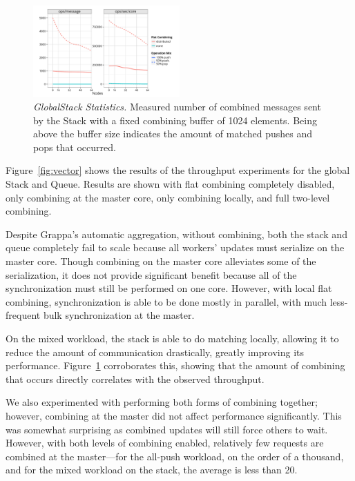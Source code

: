 \begin{figure}[t]
  \centering
  \includegraphics[width=0.5\textwidth]{data/plots/stack_stats.pdf}
  \caption{\emph{GlobalStack Statistics.}
    Measured number of combined messages sent by the Stack with a fixed combining buffer of 1024 elements. Being above the buffer size indicates the amount of matched pushes and pops that occurred.
  }
  \label{fig:stack_stats}
\end{figure}

Figure~\ref{fig:vector} shows the results of the throughput experiments for the global Stack and Queue. Results are shown with flat combining completely disabled, only combining at the master core, only combining locally, and full two-level combining.

Despite Grappa's automatic aggregation, without combining, both the stack and queue completely fail to scale because all workers' updates must serialize on the master core.
Though combining on the master core alleviates some of the serialization, it does not provide significant benefit because all of the synchronization must still be performed on one core. However, with local flat combining, synchronization is able to be done mostly in parallel, with much less-frequent bulk synchronization at the master.

On the mixed workload, the stack is able to do matching locally, allowing it to reduce the amount of communication drastically, greatly improving its performance. Figure~\ref{fig:stack_stats} corroborates this, showing that the amount of combining that occurs directly correlates with the observed throughput.

We also experimented with performing both forms of combining together; however, combining at the master did not affect performance significantly. This was somewhat surprising as combined updates will still force others to wait. However, with both levels of combining enabled, relatively few requests are combined at the master---for the all-push workload, on the order of a thousand, and for the mixed workload on the stack, the average is less than 20.

